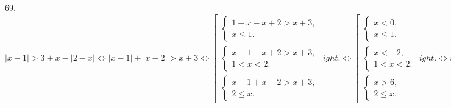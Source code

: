 69. $|x-1|>3+x-|2-x|\Leftrightarrow |x-1|+|x-2|>x+3\Leftrightarrow\left[\begin{array}{l} \begin{cases} 1-x-x+2>x+3,\\
x\leqslant1.\end{cases}\\ \begin{cases} x-1-x+2>x+3,\\ 1<x<2.\end{cases} \\ \begin{cases} x-1+x-2>x+3,\\ 2\leqslant x.\end{cases}\end{array}
ight.\Leftrightarrow
\left[\begin{array}{l} \begin{cases} x<0,\\
x\leqslant1.\end{cases}\\ \begin{cases} x<-2,\\ 1<x<2.\end{cases} \\ \begin{cases} x>6,\\ 2\leqslant x.\end{cases}\end{array}
ight.\Leftrightarrow
x\in(-\infty;0)\cup(6;+\infty).$\\
